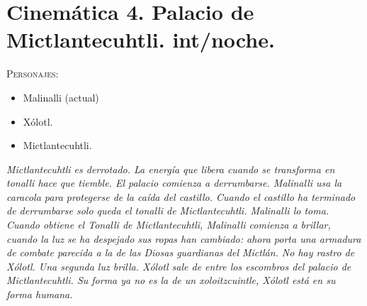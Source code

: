 \documentclass[11pt,letterpaper]{article}
\begin{document}
\section{Cinemática 4. Palacio de Mictlantecuhtli. int/noche.}
 \textsc{Personajes}:
 \begin{itemize}
 \item Malinalli (actual)
 \item Xólotl.
 \item Mictlantecuhtli.
 \end{itemize}
\textit{Mictlantecuhtli es derrotado.  La energía que libera cuando se transforma en tonalli hace que tiemble. El palacio comienza a derrumbarse. Malinalli usa la caracola para protegerse de la caída del castillo. Cuando el castillo ha terminado de derrumbarse solo queda el tonalli de Mictlantecuhtli. Malinalli lo toma. Cuando obtiene el Tonalli de Mictlantecuhtli, Malinalli comienza a brillar, cuando la luz se ha despejado sus ropas han cambiado: ahora porta una armadura de combate parecida a la de las Diosas guardianas del Mictlán. No hay rastro de Xólotl. Una segunda luz brilla. Xólotl sale de entre los escombros del palacio de Mictlantecuhtli. Su forma ya no es la de un xoloitzcuintle, Xólotl está en su forma humana. }
\end{document}
